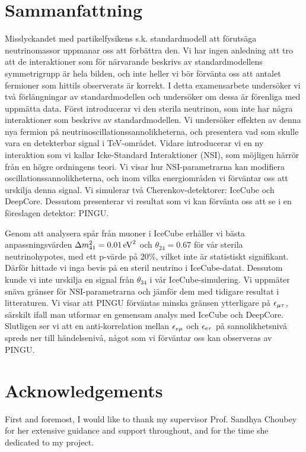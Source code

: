 \chapter*{Sammanfattning}
Misslyckandet med partikelfysikens s.k. standardmodell att förutsäga neutrinomassor uppmanar oss att förbättra den. Vi har ingen anledning att tro att
de interaktioner som för närvarande beskrivs av standardmodellens symmetrigrupp är hela bilden, och inte heller vi bör förvänta oss att antalet fermioner som hittils observerats
är korrekt.
I detta examensarbete undersöker vi två förlängningar av standardmodellen och undersöker om dessa är förenliga med uppmätta data.
Först introducerar vi den sterila neutrinon, som inte har några interaktioner som beskrivs av standardmodellen. Vi undersöker effekten av denna
nya fermion på neutrinoscillationssannolikheterna, och presentera vad som skulle vara en detekterbar signal i \si{\TeV}-området.
Vidare introducerar vi en ny interaktion som vi kallar Icke-Standard Interaktioner (NSI), som möjligen härrör från en högre ordningens teori.
Vi visar hur NSI-parametrarna kan modifiera oscillationssannolikheterna, och inom vilka energiområden vi förväntar oss att urskilja denna signal.
Vi simulerar två Cherenkov-detektorer: IceCube och DeepCore. Dessutom presenterar vi resultat som vi
kan förvänta oss att se i en föreslagen detektor: PINGU.

Genom att analysera spår från muoner i IceCube erhåller vi bästa anpassningsvärden $\dm[41] = \SI{0.01}{\eV^2}$ och $\theta_{24} = 0.67$ för vår sterila neutrinohypotes, med
ett p-värde på $20\%$, vilket inte är statistiskt signifikant. Därför hittade vi inga bevis på en steril neutrino i IceCube-datat.
Dessutom kunde vi inte urskilja en signal från $\theta_{34}$ i vår IceCube-simulering.
Vi uppmäter snäva gränser för NSI-parametrarna och jämför dem med tidigare resultat i litteraturen. Vi visar att PINGU förväntas minska gränsen ytterligare
på $\epsilon_{\mu\tau}$, särskilt ifall man utformar en gemensam analys med IceCube och DeepCore. Slutligen ser vi att en anti-korrelation mellan
$\epsilon_{e\mu}$ och $\epsilon_{e\tau}$ på sannolikhetsnivå spreds ner till händelsenivå, något som vi förväntar oss kan observeras av PINGU.

\chapter*{Acknowledgements}
First and foremost, I would like to thank my supervisor Prof. Sandhya Choubey for her extensive guidance and support throughout,
and for the time she dedicated to my project. 

